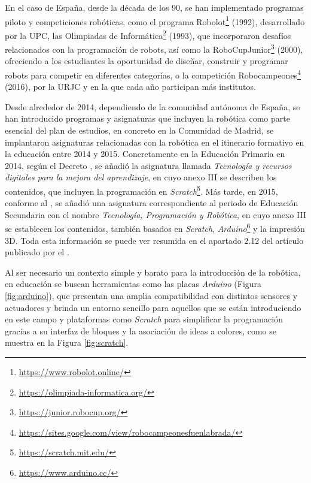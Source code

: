 En el caso de España, desde la década de los 90, se han implementado programas
piloto y competiciones robóticas, como el programa Robolot\footnote{
\url{https://www.robolot.online/}} (1992), desarrollado por la UPC, las
Olimpiadas de Informática\footnote{\url{https://olimpiada-informatica.org/}}
(1993), que incorporaron desafíos relacionados con la programación de robots,
así como la RoboCupJunior\footnote{\url{https://junior.robocup.org/}} (2000),
ofreciendo a los estudiantes la oportunidad de diseñar, construir y programar
robots para competir en diferentes categorías, o la competición
Robocampeones\footnote{
\url{https://sites.google.com/view/robocampeonesfuenlabrada/}} (2016), por la
URJC y en la que cada año participan más institutos.

Desde alrededor de 2014, dependiendo de la comunidad autónoma de España, se han
introducido programas y asignaturas que incluyen la robótica como parte esencial
del plan de estudios, en concreto en la Comunidad de Madrid, se implantaron
asignaturas relacionadas con la robótica en el itinerario formativo en la
educación entre 2014 y 2015.
Concretamente en la Educación Primaria en 2014, según el Decreto
\cite{Decreto2014}, se añadió la asignatura llamada \textit{Tecnología y
recursos digitales para la mejora del aprendizaje}, en cuyo anexo III se
describen los contenidos, que incluyen la programación en
\textit{Scratch}\footnote{\url{https://scratch.mit.edu/}}.
Más tarde, en 2015, conforme al \cite{Decreto2015}, se añadió una
asignatura correspondiente al periodo de Educación Secundaria con el nombre
\textit{Tecnología, Programación y Robótica}, en cuyo anexo III se establecen
los contenidos, también basados en \textit{Scratch},
\textit{Arduino}\footnote{\url{https://www.arduino.cc/}} y la impresión 3D.
Toda esta información se puede ver resumida en el apartado 2.12 del artículo
publicado por el \cite{EducacionRob}.

Al ser necesario un contexto simple y barato para la introducción de la
robótica, en educación se buscan herramientas como las placas \textit{Arduino}
(Figura \ref{fig:arduino}), que presentan una amplia compatibilidad con
distintos sensores y actuadores y brinda un entorno sencillo para aquellos que
se están introduciendo en este campo y plataformas como \textit{Scratch} para
simplificar la programación gracias a su interfaz de bloques y la asociación de
ideas a colores, como se muestra en la Figura \ref{fig:scratch}.

